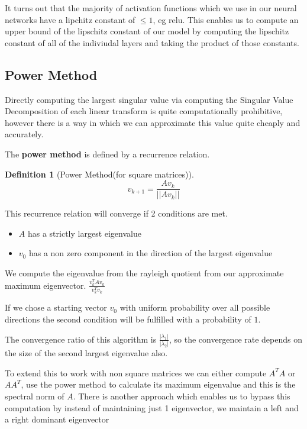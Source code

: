 \documentclass[12pt, a4paper]{report}
\theoremstyle{definition}
\theoremstyle{definition}
\newtheorem{definition}{Definition}[section]
\theoremstyle{definition}
\begin{document}
It turns out that the majority of activation functions which we use in our neural networks have a lipchitz constant of $\leq 1$, eg relu. This enables us to compute an upper bound of the lipschitz constant of our model by computing the lipschitz constant of all of the indiviudal layers and taking the product of those constants.



\subsection{Power Method}

Directly computing the largest singular value via computing the Singular Value Decomposition of each linear transform is quite computationally prohibitive, however there is a way in which we can approximate this value quite cheaply and accurately.

The \textbf{power method} is defined by a recurrence relation.

\begin{definition}[Power Method(for square matrices)]
    $$v_{k+1} = \frac{Av_k}{||Av_k||} $$
\end{definition}

This recurrence relation will converge if 2 conditions are met.

\begin{itemize}
    \item $A$ has a strictly largest eigenvalue
    \item $v_0$ has a non zero component in the direction of the largest eigenvalue
\end{itemize}

We compute the eigenvalue from the rayleigh quotient from our approximate maximum eigenvector. $\frac{v_k^T A v_k}{v_k ^ T v_k}$

If we chose a starting vector $v_0$ with uniform probability over all possible directions the second condition will be fulfilled with a probability of $1$.

The convergence ratio of this algorithm is $\frac{|\lambda_1|}{|\lambda_2|}$, so the convergence rate depends on the size of the second largest eigenvalue also.


To extend this to work with non square matrices we can either compute $A^TA$ or $AA^T$, use the power method to calculate its maximum eigenvalue and this is the spectral norm of $A$.
There is another approach which enables us to bypass this computation by instead of maintaining just 1 eigenvector, we maintain a left and a right dominant eigenvector
\end{document}

